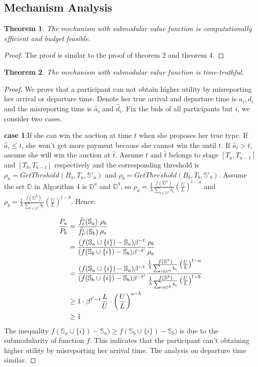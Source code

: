 \documentclass[conference,compsocconf,letterpaper,10pt]{IEEEtran}
\newtheorem{theorem}{Theorem}
\begin{document}
\subsection{Mechanism Analysis}
\begin{theorem}
The mechanism with submodular value function is computationally efficient and budget feasible.
\end{theorem}
\begin{proof}
The proof is similar to the proof of theorem 2 and theorem 4.
\end{proof}
\begin{theorem}
The mechanism with submodular value function is time-truthful.
\end{theorem}
\begin{proof}
We prove that a participant can not obtain higher utility by misreporting her arrival or departure time. Denote her true arrival and departure time is $a_i, d_i$ and the misreporting time is $\hat{a}_i$ and $\hat{d}_i$. Fix the bids of all participants but $i$, we consider two cases.

\textbf{case 1}:If she can win the auction at time $t$ when she proposes her true type. If $\hat{a}_i\le t$, she won't get more payment because she cannot win the until $t$. If $\hat{a}_i>t$, assume she will win the auction at $\hat{t}$. Assume $t$ and $\hat{t}$ belongs to stage $[T_a,T_{a-1}]$ and $[T_b,T_{b-1}]$ respectively and the corresponding threshold is $\rho_a=GetThrshold(B_a, T_a, \mathbb{S'}_a)$ and $\rho_b=GetThreshold(B_b,T_b,\mathbb{S'}_b)$. Assume the set $\mathbb{D}$ in Algorithm 4 is $\mathbb{D}^a$ and $\mathbb{D}^b$, so
$\rho_a=\frac{1}{\lambda}\frac{f(\mathbb{D}^{a})}{\sum_{i\in\mathbb{D}^{a}}b_i}\left(\frac{U}{L}\right)^{l-a}$ and $\rho_b=\frac{1}{\lambda}\frac{f(\mathbb{D}^{b})}{\sum_{i\in\mathbb{D}^{b}}b_i}\left(\frac{U}{L}\right)^{l-b}$. Hence:

\begin{align}
\frac{P_a}{P_b}&=\frac{\tilde{f}^i_t(\mathbb{S}_a)}{\tilde{f}^i_{t'}(\mathbb{S}_b)}\frac{\rho_b}{\rho_a} \notag \\
&=\frac{(f(\mathbb{S}_a\cup\{i\})-\mathbb{S}_a)\beta^{-t}}{(f(\mathbb{S}_b\cup\{i\})-\mathbb{S}_b)\beta^{-t'}}\frac{\rho_b}{\rho_a}\notag \\
&=\frac{(f(\mathbb{S}_a\cup\{i\})-\mathbb{S}_a)\beta^{-t}}{(f(\mathbb{S}_b\cup\{i\})-\mathbb{S}_b)\beta^{-t'}}\frac{\frac{1}{\lambda}\frac{f(\mathbb{D}^{a})}{\sum_{i\in\mathbb{D}^{a}}b_i}\left(\frac{U}{L}\right)^{l-a}}{\frac{1}{\lambda}\frac{f(\mathbb{D}^{b})}{\sum_{i\in\mathbb{D}^{b}}b_i}\left(\frac{U}{L}\right)^{l-b}} \notag \\
&\ge 1 \cdot \beta^{t'-t}\frac{L}{U}  \cdot \left(\frac{U}{L}\right)^{a-b}\notag \\
&\ge 1 \notag
\end{align}
The inequality $f(\mathbb{S}_a\cup\{i\})-\mathbb{S}_a) \ge f(\mathbb{S}_b\cup\{i\})-\mathbb{S}_b)$ is due to the submodularity of function $f$. This indicates that the participant can't obtaining higher utility by misreporting her arrival time. The analysis on departure time similar.


\end{proof}
\end{document}
